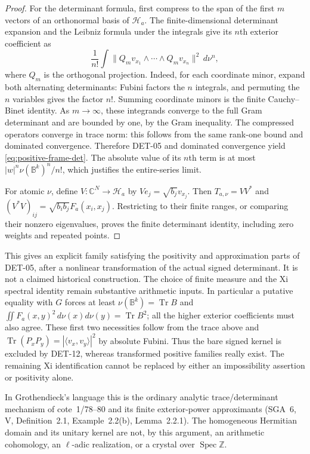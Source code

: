 \documentclass[11pt,a4paper]{article}
\begin{document}
\begin{proof}
For the determinant formula, first compress to the span of the first $m$
vectors of an orthonormal basis of $\mathcal H_a$.  The finite-dimensional
determinant expansion and the Leibniz formula under the integrals give its
$n$th exterior coefficient as
\[
 \frac1{n!}\int
 \|Q_mv_{x_1}\wedge\cdots\wedge Q_mv_{x_n}\|^2\,d\nu^n,
\]
where $Q_m$ is the orthogonal projection.  Indeed, for each coordinate minor,
expand both alternating determinants: Fubini factors the $n$ integrals, and
permuting the $n$ variables gives the factor $n!$.  Summing coordinate minors
is the finite Cauchy--Binet identity.  As $m\to\infty$, these integrands
converge to the full Gram determinant and are bounded by one, by the Gram
inequality.  The compressed operators converge in trace norm: this follows
from the same rank-one bound and dominated convergence.  Therefore DET-05
and dominated convergence yield \eqref{eq:positive-frame-det}.  The absolute
value of its $n$th term is at most
$|w|^n\nu(\mathbb B^k)^n/n!$, which justifies the entire-series limit.

For atomic $\nu$, define $V:\mathbb C^N\to\mathcal H_a$ by
$Ve_j=\sqrt{b_j}v_{x_j}$.  Then $T_{a,\nu}=VV^*$ and
$(V^*V)_{ij}=\sqrt{b_i b_j}F_a(x_i,x_j)$.  Restricting to their finite
ranges, or comparing their nonzero eigenvalues, proves the finite determinant
identity, including zero weights and repeated points.
\end{proof}

This gives an explicit family satisfying the positivity and approximation
parts of DET-05, after a nonlinear transformation of the actual signed
determinant.  It is not a claimed historical construction.  The choice of
finite measure and the Xi spectral identity remain substantive arithmetic
inputs.  In particular a putative equality with $G$ forces at least
$\nu(\mathbb B^k)=\operatorname{Tr}B$ and
$\iint F_a(x,y)^2\,d\nu(x)d\nu(y)=\operatorname{Tr}B^2$; all the higher
exterior coefficients must also agree.  These first two necessities follow
from the trace above and
$\operatorname{Tr}(P_xP_y)=|\langle v_x,v_y\rangle|^2$ by absolute Fubini.
Thus the bare signed kernel is excluded by DET-12, whereas transformed
positive families really exist.  The remaining Xi identification cannot be
replaced by either an impossibility assertion or positivity alone.

In Grothendieck's language this is the ordinary analytic trace/determinant
mechanism of cote~1/78--80 and its finite exterior-power approximants
(SGA~6, V, Definition~2.1, Example~2.2(b), Lemma~2.2.1).  The homogeneous
Hermitian domain and its unitary kernel are not, by this argument, an
arithmetic cohomology, an $\ell$-adic realization, or a crystal over
$\operatorname{Spec}\mathbb Z$.
\end{document}
